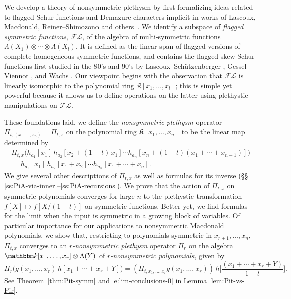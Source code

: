 \documentclass[12pt]{amsart}
\theoremstyle{definition}
\theoremstyle{remark}
\newcommand{\kk}{{\mathbbm k}}
\newcommand{\Kfrak}{{\mathfrak K}}
\newcommand{\FLambda}{\mathcal{F\!L}}
\newcommand{\Pisf}{{\mathsf \Pi }}
\begin{document}
We develop a theory of nonsymmetric plethysm by first formalizing
ideas related to flagged Schur functions and Demazure characters
implicit in works of Lascoux, Macdonald, Reiner--Shimozono and
others~\cite{Lascoux12, Macdonald91, RS}.  We identify a subspace of
\emph{flagged symmetric functions}, \(\FLambda\), of the algebra of
multi-symmetric functions $\Lambda(X_{1}) \otimes \cdots \otimes
\Lambda(X_{l})$.  It is defined as the linear span of flagged versions
of complete homogeneous symmetric functions, and contains the flagged
skew Schur functions first studied in the 80's and 90's by
Lascoux--Sch\"utzenberger \cite{LascouxSchutz82}, Gessel--Viennot
\cite{GessVien89}, and Wachs \cite{Wachs}.  Our viewpoint begins with
the observation that $\FLambda $ is linearly isomorphic to the
polynomial ring $\Kfrak[x_1, \dots, x_l]$; this is simple yet powerful
because it allows us to define operations on the latter using
plethystic manipulations on $\FLambda$.

These foundations laid, we define the \emph{nonsymmetric plethysm}
operator \(\Pi_{t,(x_1,\dots, x_n)} = \Pi_{t,x}\) on the polynomial
ring $\Kfrak[x_1, \dots, x_n]$ to be the linear map determined by
\begin{multline}\label{e nspleth intro}
  \Pi_{t,x} \Big(
 h_{a_{1}}[x_{1}]\, h_{a_{2}}[x_{2}+(1-t)\, x_{1}]\cdots
h_{a_{n}}[x_{n}+(1-t)(x_{1}+\cdots +x_{n-1})]\Big) \\ =
h_{a_{1}}[x_{1}]\, h_{a_{2}}[x_1+x_{2}]\cdots h_{a_{n}}[x_1+\cdots +x_n].
\end{multline}
We give several other descriptions of \(\Pi_{t,x}\) as well as
formulas for its inverse (\S \S
\ref{ss:PiA-via-inner}--\ref{ss:PiA-recursions}).  We prove that the
action of $\Pi_{t,x}$ on symmetric polynomials converges for large $n$
to the plethystic transformation \(f[X] \mapsto f[X/(1-t)]\) on
symmetric functions.  Better yet, we find formulas for the limit when
the input is symmetric in a growing block of variables.  Of particular
importance for our applications to nonsymmetric Macdonald polynomials,
we show that, restricting to polynomials symmetric in $x_{r+1}, \dots,
x_n$, $\Pi_{t,x}$ converges to an {\em $r$-nonsymmetric plethysm}
operator $\Pisf_r$ on the algebra \(\kk[x_1,\ldots,x_r] \otimes
\Lambda(Y) \) of \emph{\(r\)-nonsymmetric polynomials}, given by
\begin{equation}\label{e:Pir-preview}
\Pisf _{r} \bigl(g(x_{1},\ldots,x_{r})\, h[x_1+\cdots+x_r+Y] \bigr) =
(\Pi _{t,x_1,\dots, x_r} g(x_1, \dots, x_r))\,
h\Big[\frac{(x_1+\cdots+x_r+Y)}{1-t}\Big].
\end{equation}
See Theorem~\ref{thm:Pit-symm} and \eqref{e:lim-conclusions-0} in
Lemma \ref{lem:Pit-vs-Pir}.
\end{document}
